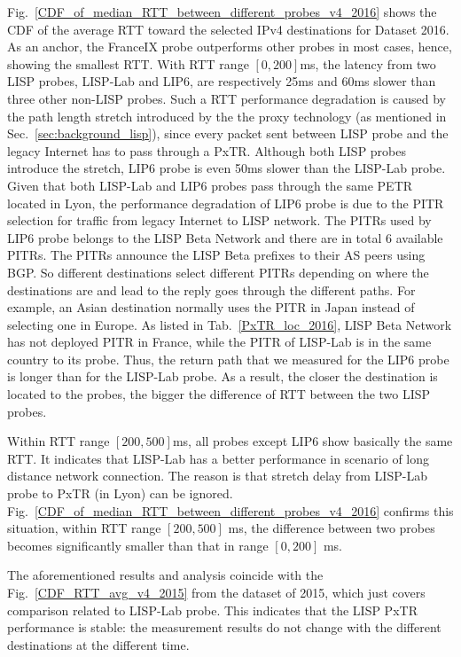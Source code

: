 Fig.~\ref{CDF_of_median_RTT_between_different_probes_v4_2016} shows the CDF of the average RTT toward the selected IPv4 destinations for Dataset 2016. %
As an anchor, the FranceIX probe outperforms other probes in most cases, hence, showing the smallest RTT. With RTT range $[0, 200]$ms, the latency from two LISP probes, LISP-Lab and LIP6, are respectively 25ms and 60ms slower than three other non-LISP probes. Such a RTT performance degradation is caused by the path length stretch introduced by the the proxy technology (as mentioned in Sec.~\ref{sec:background_lisp}), since every packet sent between LISP probe and the legacy Internet has to pass through a PxTR. Although both LISP probes introduce the stretch, LIP6 probe is even 50ms slower than the LISP-Lab probe. Given that both LISP-Lab and LIP6 probes pass through the same PETR located in Lyon, the performance degradation of LIP6 probe is due to the PITR selection for traffic from legacy Internet to LISP network. The PITRs used by LIP6 probe belongs to the LISP Beta Network and there are in total 6 available PITRs. The PITRs announce the LISP Beta prefixes to their AS peers using BGP. So different destinations select different PITRs depending on where the destinations are and lead to the reply goes through the different paths. For example, an Asian destination normally uses the PITR in Japan instead of selecting one in Europe. As listed in Tab.~\ref{PxTR_loc_2016}, LISP Beta Network has not deployed PITR in France, while the PITR of LISP-Lab is in the same country to its probe. Thus, the return path that we measured for the LIP6 probe is longer than for the LISP-Lab probe. As a result, the closer the destination is located to the probes, the bigger the difference of RTT between the two LISP probes.

Within RTT range $[200, 500]$ms, all probes except LIP6 show basically the same RTT. It indicates that LISP-Lab has a better performance in scenario of long distance network connection. The reason is that stretch delay from LISP-Lab probe to PxTR (in Lyon) can be ignored. Fig.~\ref{CDF_of_median_RTT_between_different_probes_v4_2016} confirms this situation, within RTT range $[200, 500]$ ms, the difference between two probes becomes significantly smaller than that in range $[0, 200]$ ms.

The aforementioned results and analysis coincide with the Fig.~\ref{CDF_RTT_avg_v4_2015} from the dataset of 2015, which just covers comparison related to LISP-Lab probe. This indicates that the LISP PxTR performance is stable: the measurement results do not change with the different destinations at the different time. 

